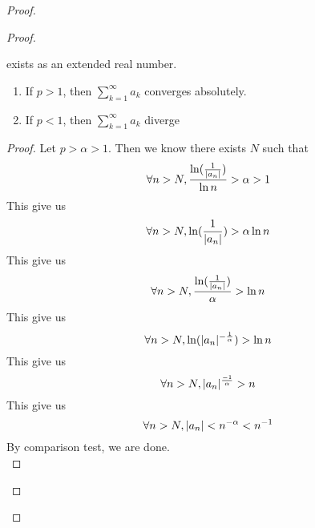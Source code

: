 \documentclass{report}
\begin{document}
\begin{proof}
\begin{proof}
\begin{question}{}{}
\begin{enumerate}
\[    \]
    exists as an extended real number.
    \begin{enumerate}
        \item If \( p > 1 \), then \(\sum_{k=1}^{\infty} a_k\) converges absolutely.
        \item If \( p < 1 \), then $\sum _{k=1}^\infty a_k$ diverge
    \end{enumerate}
\end{enumerate}
\end{question}
\begin{proof}
Let $p>\alpha >1$.  Then we know there exists $N$ such that
 \begin{equation}
\forall n>N, \frac{\ln (\frac{1}{|a_n|})}{\ln n}>\alpha >1
\end{equation}
This give us
\begin{equation}
\forall n>N, \ln(\frac{1}{|a_n|})>\alpha \ln n 
\end{equation}
This give us
\begin{equation}
\forall n>N, \frac{\ln (\frac{1}{|a_n|})}{\alpha }>\ln n
\end{equation}
This give us
\begin{equation}
\forall n>N, \ln (|a_n|^{-\frac{1}{\alpha }})>\ln n
\end{equation}
This give us
\begin{equation}
\forall n>N, |a_n|^{\frac{-1}{\alpha }}>n
\end{equation}
This give us
\begin{equation}
\forall n>N, |a_n|<n^{-\alpha }<n^{-1}
\end{equation}
By comparison test, we are done.\\


\end{proof}
\end{proof}
\end{proof}
\end{document}
